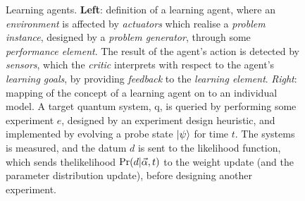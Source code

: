 \begin{figure}
\begin{minipage}[c]{0.4\textwidth}
    \end{minipage}


    \caption[Learning agents]{
        Learning agents. \textbf{Left}: definition of a learning agent, where an \emph{environment} is affected by 
        \emph{actuators} which realise a \emph{problem instance}, designed by a \emph{problem generator}, through some \emph{performance element}. 
        The result of the agent's action is detected by \emph{sensors}, which the \emph{critic} interprets with respect to
        the agent's \emph{learning goals}, by providing \emph{feedback} to the \emph{learning element}. 
        \emph{Right}: mapping of the concept of a learning agent on to an individual model. 
        A target quantum system, \gls{q}, is queried by performing some experiment $e$, 
        designed by an experiment design heuristic, and implemented by evolving a \gls{probe} state $\ket{\psi}$ for time $t$. 
        The systems is measured, and the datum $d$ is sent to the \gls{likelihood} function, which sends the\gls{likelihood} $\Pr(d|\vec{\alpha}, t)$
        to the weight update (and the parameter distribution update), before designing another experiment. 
    }
    \label{fig:learning_agent}
\end{figure}

   